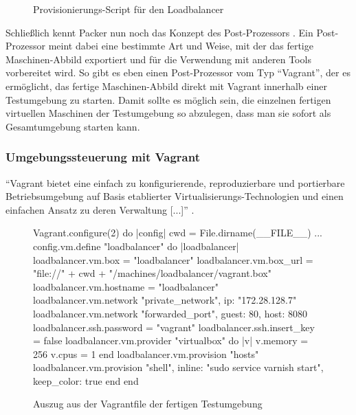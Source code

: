 \begin{figure}[!ht]
  \begin{center}
    \caption{Provisionierungs-Script für den Loadbalancer}
    \label{Loadbalancer-Install}
  \end{center}
\end{figure}

Schließlich kennt Packer nun noch das Konzept des Post-Prozessors \citep[Vgl.][]{Packer:003}. Ein Post-Prozessor meint dabei eine bestimmte Art und Weise, mit der das fertige Maschinen-Abbild exportiert und für die Verwendung mit anderen Tools vorbereitet wird. So gibt es eben einen Post-Prozessor vom Typ "`Vagrant"', der es ermöglicht, das fertige Maschinen-Abbild direkt mit Vagrant innerhalb einer Testumgebung zu starten. Damit sollte es möglich sein, die einzelnen fertigen virtuellen Maschinen der Testumgebung so abzulegen, dass man sie sofort als Gesamtumgebung starten kann.

\subsubsection{Umgebungssteuerung mit Vagrant}

"`Vagrant bietet eine einfach zu konfigurierende, reproduzierbare und portierbare Betriebsumgebung auf Basis etablierter Virtualisierungs-Technologien und einen einfachen Ansatz zu deren Verwaltung [...]"' \citep[Siehe][]{Vagrant:001}.

\begin{figure}[!ht]
  \begin{center}
    \begin{rubycode}
Vagrant.configure(2) do |config|
    cwd = File.dirname(__FILE__)
    ...
    config.vm.define "loadbalancer" do |loadbalancer|
        loadbalancer.vm.box = "loadbalancer"     
        loadbalancer.vm.box_url = "file://"
            + cwd + "/machines/loadbalancer/vagrant.box"
        loadbalancer.vm.hostname = "loadbalancer"
        loadbalancer.vm.network "private_network", ip: "172.28.128.7"
        loadbalancer.vm.network "forwarded_port", guest: 80, host: 8080
        loadbalancer.ssh.password = "vagrant"
        loadbalancer.ssh.insert_key = false
        loadbalancer.vm.provider "virtualbox" do |v|
            v.memory = 256
            v.cpus = 1
        end
        loadbalancer.vm.provision "hosts"
        loadbalancer.vm.provision "shell",
            inline: "sudo service varnish start",
            keep_color: true
    end
end
    \end{rubycode}
    \caption{Auszug aus der Vagrantfile der fertigen Testumgebung}
    \label{Vagrantfile}
  \end{center}
\end{figure}

